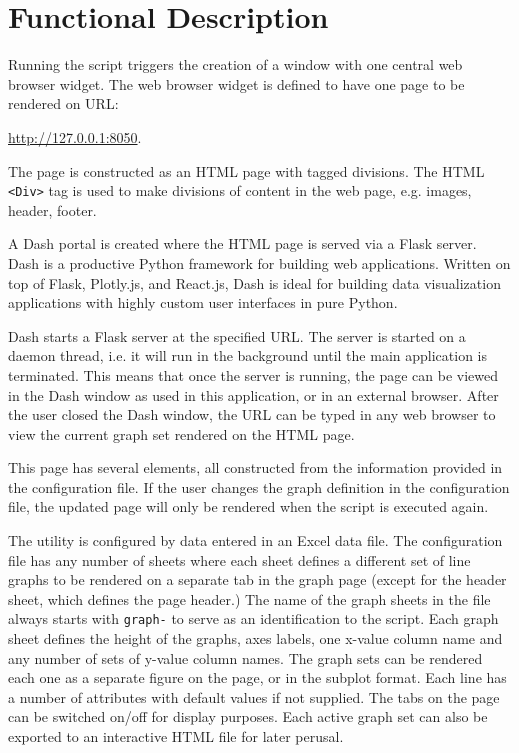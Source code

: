 
\chapter{Functional Description}

Running the script triggers the creation of a window with one central web browser widget.
The web browser widget is defined to have one page to be rendered on \ac{URL}:

 \url{http://127.0.0.1:8050}.

The page is constructed as an \ac{HTML} page with tagged divisions.
The \ac{HTML} \texttt{<Div>} tag is used to make divisions of content in the web page, e.g. images, header, footer.

A Dash portal is created where the \ac{HTML} page is served via a Flask server.
Dash is a productive Python framework for building web applications.
Written on top of Flask, Plotly.js, and React.js, Dash is ideal for building data visualization applications with highly custom user interfaces in pure Python.

Dash starts a Flask server at the specified \ac{URL}.
The server is started on a daemon thread, i.e. it will run in the background until the main application is terminated.
This means that once the server is running, the page can be viewed in the Dash window as used in this application, or in an external browser.
After the user closed the Dash window, the \ac{URL} can be typed in any web browser to view the current graph set rendered on the \ac{HTML} page.

This page has several elements, all constructed from the information provided in the configuration file. If the user changes the graph definition in the configuration file, the updated page will only be rendered when the script is executed again.

The utility is configured by data entered in an Excel data file. 
The configuration file has any number of sheets where each sheet defines
a different set of line graphs to be rendered on a separate tab in the graph page
(except for the header sheet, which defines the page header.)
The name of the graph sheets in the file always starts with \texttt{graph-} to serve as an identification to the script.
Each graph sheet defines the height of the graphs, axes labels,
one x-value column name and any number of sets of y-value column names.
The graph sets can be rendered each one as a separate figure on the page, or in the subplot format.
Each line has a number of attributes with default values if not supplied.
The tabs on the page can be switched on/off for display purposes.
Each active graph set can also be exported to an interactive \ac{HTML} file for later perusal.

